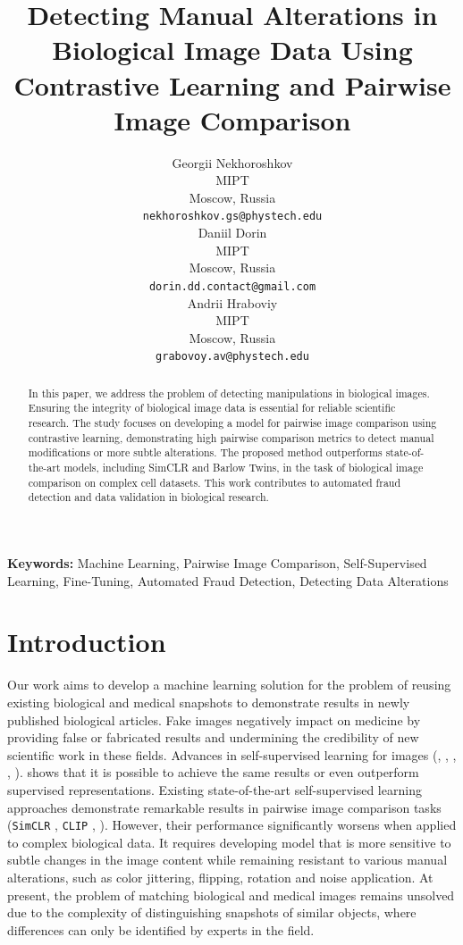 \documentclass{article}
\title{Detecting Manual Alterations in Biological Image Data 
Using Contrastive Learning and Pairwise Image Comparison}
\author{%
  Georgii Nekhoroshkov\\
  MIPT\\
  Moscow, Russia\\
  \texttt{nekhoroshkov.gs@phystech.edu}\\
  \And
  Daniil Dorin\\
  MIPT\\
  Moscow, Russia\\
  \texttt{dorin.dd.contact@gmail.com}\\
  \And
  Andrii Hraboviy\\
  MIPT\\
  Moscow, Russia\\
  \texttt{grabovoy.av@phystech.edu}\\
}
\begin{document}
\maketitle

\begin{abstract}

    In this paper, we address the problem of detecting manipulations in biological images. 
    Ensuring the integrity of biological 
    image data is essential for reliable scientific research. 
    The study focuses on developing a model for pairwise image comparison
    using contrastive learning, demonstrating high pairwise comparison metrics to detect 
    manual modifications or more subtle alterations. 
    The proposed method outperforms state-of-the-art models, 
    including SimCLR and Barlow Twins, in the task of biological 
    image comparison on complex cell datasets. 
    This work contributes to automated fraud detection and data validation in 
    biological research.

\end{abstract}

\textbf{Keywords:}
Machine Learning, Pairwise Image Comparison, Self-Supervised Learning, 
Fine-Tuning, Automated Fraud Detection, Detecting Data Alterations

\section{Introduction}\label{sec:intro}

Our work aims to develop a machine learning solution for the problem 
of reusing existing biological and medical snapshots to demonstrate results 
in newly published biological articles. Fake images negatively impact on 
medicine by providing false or fabricated results and undermining the credibility 
of new scientific work in these fields. Advances in self-supervised learning for 
images (\cite{caron2020unsupervised_ssl}, \cite{chen2020exploring_siamese}, 
\cite{chen2020improved_moco}, \cite{chen2020simple_contrastive}, \cite{grill2020approach_ssl}).
shows that it is possible to achieve the same results or even outperform supervised 
representations. 
Existing state-of-the-art self-supervised learning 
approaches demonstrate remarkable results in pairwise image comparison tasks 
(\texttt{SimCLR} \cite{chen2020simclr}, \texttt{CLIP} \cite{radford2021clip}, 
 \cite{zbontar2021barlow}). 
However, their performance significantly worsens when applied to complex biological data. 
It requires developing model that is more sensitive to subtle changes in the image content 
while remaining resistant to various manual alterations, such as color jittering, 
flipping, rotation and noise application. 
At present, the problem of matching biological and medical images remains unsolved due 
to the complexity of distinguishing snapshots of similar objects, where 
differences can only be identified by experts in the field.
\end{document}
